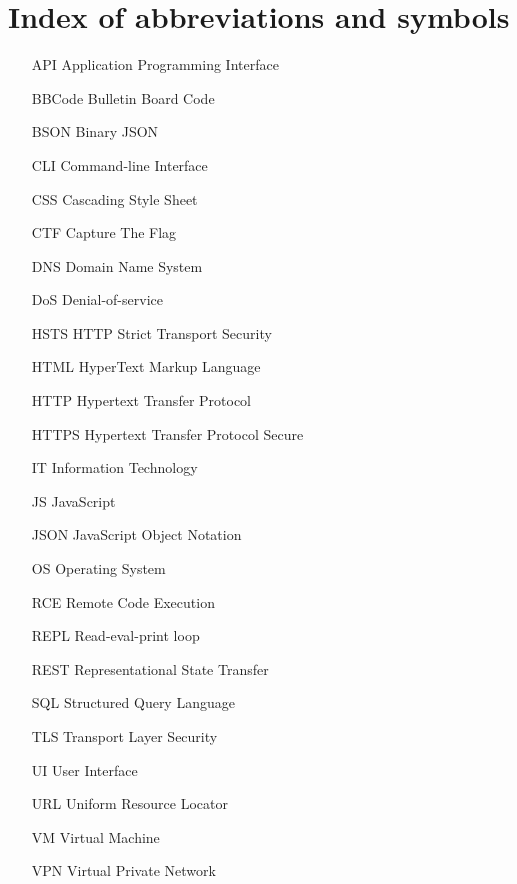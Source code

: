 \chapter{Index of abbreviations and symbols}

\begin{itemize}
	\item[API] Application Programming Interface
	\item[BBCode] Bulletin Board Code
	\item[BSON] Binary JSON
	\item[CLI] Command-line Interface
	\item[CSS] Cascading Style Sheet
	\item[CTF] Capture The Flag
	\item[DNS] Domain Name System
	\item[DoS] Denial-of-service
	\item[HSTS] HTTP Strict Transport Security
	\item[HTML] HyperText Markup Language
	\item[HTTP] Hypertext Transfer Protocol
	\item[HTTPS] Hypertext Transfer Protocol Secure
	\item[IT] Information Technology
	\item[JS] JavaScript
	\item[JSON] JavaScript Object Notation
	\item[OS] Operating System
	\item[RCE] Remote Code Execution
	\item[REPL] Read-eval-print loop
	\item[REST] Representational State Transfer
	\item[SQL] Structured Query Language
	\item[TLS] Transport Layer Security
	\item[UI] User Interface
	\item[URL] Uniform Resource Locator
	\item[VM] Virtual Machine
	\item[VPN] Virtual Private Network
\end{itemize}
